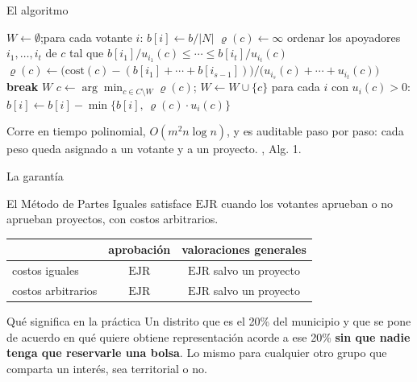 \documentclass[11pt, aspectratio=169]{beamer}
\newcommand{\voters}{N}                 %
\newcommand{\projects}{C}               %
\newcommand{\budget}{b}                 %
\newcommand{\cost}{\mathrm{cost}}       %
\newcommand{\util}{u}                   %
\newcommand{\mesrho}{\ensuremath{\varrho}}          %
\newcommand{\EJR}{\ensuremath{\mathrm{EJR}}}
\begin{document}
\begin{frame}{El algoritmo}
  \vspace{-0.4em}
  \scriptsize
  \begin{algorithmic}[1]
    \State $W \gets \emptyset$;\quad para cada votante $i$: $b[i] \gets \budget/|\voters|$
      \For{$c \in \projects \setminus W$}
        \If{$\sum_{i:\, \util_i(c)>0} b[i] < \cost(c)$}
          \State $\mesrho(c) \gets \infty$ 
        \Else
          \State ordenar los apoyadores $i_1,\dots,i_t$ de $c$ tal que
                 $b[i_1]/\util_{i_1}(c) \leq \cdots \leq b[i_t]/\util_{i_t}(c)$
            \State $\mesrho(c) \gets
                   \bigl(\cost(c) - (b[i_1]+\cdots+b[i_{s-1}])\bigr) \big/
                   \bigl(\util_{i_s}(c)+\cdots+\util_{i_t}(c)\bigr)$
            \If{$\mesrho(c)\cdot \util_{i_s}(c) \leq b[i_s]$} \State \textbf{break} \EndIf
          \EndFor
        \EndIf
      \EndFor
      \If{$\min_{c} \mesrho(c) = \infty$} \State \Return $W$ \EndIf
      \State $c \gets \arg\min_{c \in \projects\setminus W} \mesrho(c)$;\quad
             $W \gets W \cup \{c\}$
      \State para cada $i$ con $\util_i(c)>0$:\;
             $b[i] \gets b[i] - \min\{b[i],\, \mesrho(c)\cdot \util_i(c)\}$
    \EndWhile
  \end{algorithmic}

  \vspace{0.3em}
  {\scriptsize Corre en tiempo polinomial, $O(m^2 n\log n)$, y es auditable paso
  por paso: cada peso queda asignado a un votante y a un proyecto.
  \hfill {\tiny \citet{peters2021}, Alg. 1.}}
\end{frame}

\begin{frame}{La garantía}
  \begin{theorem}
    El Método de Partes Iguales satisface \EJR{} cuando los votantes aprueban o
    no aprueban proyectos, con costos arbitrarios.
  \end{theorem}

  \vspace{0.4em}
  \centering
  \small
  \begin{tabular}{lcc}
    \toprule
    & aprobación & valoraciones generales \\
    \midrule
    costos iguales     & \EJR & \EJR{} salvo un proyecto \\
    costos arbitrarios & \EJR & \EJR{} salvo un proyecto \\
    \bottomrule
  \end{tabular}

  \vspace{0.6em}
  \raggedright
  \begin{block}{Qué significa en la práctica}
    Un distrito que es el 20\% del municipio y que se pone de acuerdo en qué
    quiere obtiene representación acorde a ese 20\% \textbf{sin que nadie tenga
    que reservarle una bolsa}. Lo mismo para cualquier otro grupo que comparta
    un interés, sea territorial o no.
  \end{block}
\end{frame}
\end{document}
